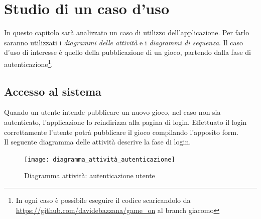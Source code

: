 \chapter{Studio di un caso d'uso}
In questo capitolo sarà analizzato un caso di utilizzo dell'applicazione. Per farlo saranno utilizzati i \emph{diagrammi delle attività} e i \emph{diagrammi di sequenza}. Il caso d'uso di interesse è quello della pubblicazione di un gioco, partendo dalla fase di autenticazione\footnote{In ogni caso è possibile eseguire il codice scaricandolo da \url{https://github.com/davidebazzana/game\_on} al branch giacomo}.\\

\section{Accesso al sistema}
Quando un utente intende pubblicare un nuovo gioco, nel caso non sia autenticato, l'applicazione lo reindirizza alla pagina di login. Effettuato il login correttamente l'utente potrà pubblicare il gioco compilando l'apposito form.\\
Il seguente diagramma delle attività descrive la fase di login.
\begin{figure}[H]
    \centering
    \texttt{[image: diagramma\_attività\_autenticazione]}
    \caption{Diagramma attività: autenticazione utente}
\end{figure}

